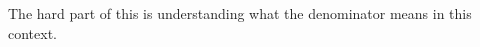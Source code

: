 \documentclass[12pt]{article}
\begin{document}
\begin{enumerate}
{The hard part of this is understanding what the denominator means in this context.}





%
%
%
%
%
%


\end{enumerate}
\end{document}
